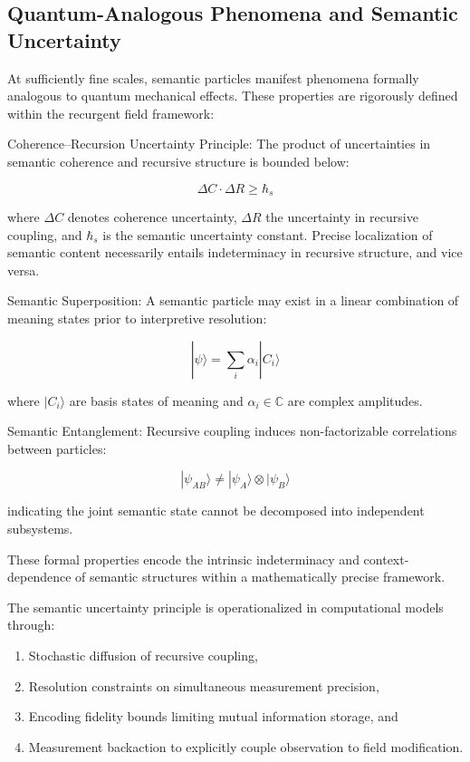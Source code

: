 \subsection{Quantum-Analogous Phenomena and Semantic Uncertainty}

At sufficiently fine scales, semantic particles manifest phenomena formally analogous to quantum mechanical effects. These properties are rigorously defined within the recurgent field framework:

Coherence–Recursion Uncertainty Principle: The product of uncertainties in semantic coherence and recursive structure is bounded below:

\begin{equation}
\Delta C \cdot \Delta R \geq \hbar_s
\end{equation}

where \(\Delta C\) denotes coherence uncertainty, \(\Delta R\) the uncertainty in recursive coupling, and \(\hbar_s\) is the semantic uncertainty constant. Precise localization of semantic content necessarily entails indeterminacy in recursive structure, and vice versa.

Semantic Superposition: A semantic particle may exist in a linear combination of meaning states prior to interpretive resolution:

\begin{equation}
|\psi\rangle = \sum_i \alpha_i |C_i\rangle
\end{equation}

where \(|C_i\rangle\) are basis states of meaning and \(\alpha_i \in \mathbb{C}\) are complex amplitudes.

Semantic Entanglement: Recursive coupling induces non-factorizable correlations between particles:

\begin{equation}
|\psi_{AB}\rangle \neq |\psi_A\rangle \otimes |\psi_B\rangle
\end{equation}

indicating the joint semantic state cannot be decomposed into independent subsystems.

These formal properties encode the intrinsic indeterminacy and context-dependence of semantic structures within a mathematically precise framework.

The semantic uncertainty principle is operationalized in computational models through:

\begin{enumerate}
    \item Stochastic diffusion of recursive coupling,
    \item Resolution constraints on simultaneous measurement precision,
    \item Encoding fidelity bounds limiting mutual information storage, and
    \item Measurement backaction to explicitly couple observation to field modification.
\end{enumerate}

